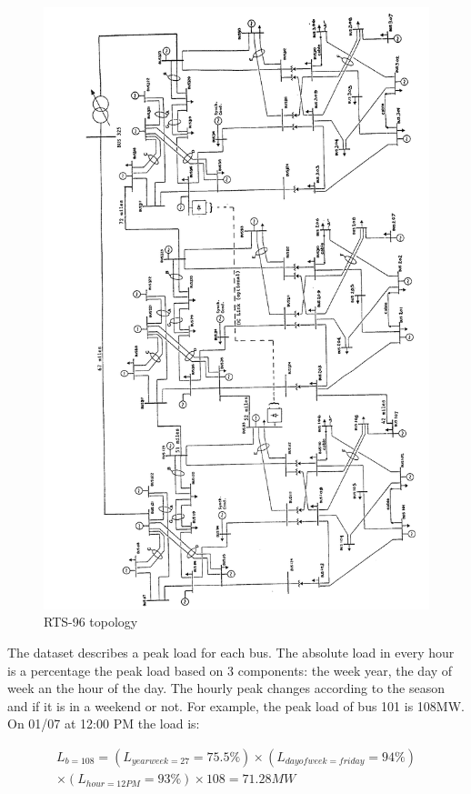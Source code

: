 \documentclass[12pt,LUDisStyle,twosided]{book}
\begin{document}
\begin{figure} 
  \includegraphics[width=\textwidth,height=\textheight,keepaspectratio]{ieeetopology.png}
  \caption{RTS-96 topology \cite{wongieee}}
  \label{fig:ieeetopology}
\end{figure}

The dataset describes a peak load for each bus. The absolute load in every hour is a percentage the peak load based on 3 components: the week year, the day of week an the hour of the day. The hourly peak changes according to the season and if it is in a weekend or not. For example, the peak load of bus 101 is 108MW. On 01/07 at 12:00 PM the load is:

\begin{multline}
L_{b = 108} =  (L_{yearweek = 27} = 75.5\%) \times (L_{dayofweek = friday} = 94\%) 
\\ \times (L_{hour= 12 PM} = 93\%) \times 108 = 71.28MW
\end{multline}
\end{document}
